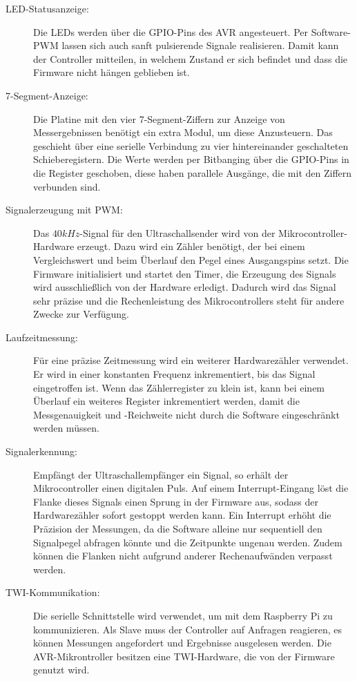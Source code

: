 \begin{description} %
	\item[LED-Statusanzeige:] Die LEDs werden über die \ac{GPIO}-Pins des AVR angesteuert. Per Software-\ac{PWM} lassen sich auch sanft pulsierende Signale realisieren. Damit kann der Controller mitteilen, in welchem Zustand er sich befindet und dass die Firmware nicht hängen geblieben ist.
	\item[7-Segment-Anzeige:] Die Platine mit den vier 7-Segment-Ziffern zur Anzeige von Messergebnissen benötigt ein extra Modul, um diese Anzusteuern. Das geschieht über eine serielle Verbindung zu vier hintereinander geschalteten Schieberegistern. Die Werte werden per \ac{Bitbanging} über die \ac{GPIO}-Pins in die Register geschoben, diese haben parallele Ausgänge, die mit den Ziffern verbunden sind.
	\item[Signalerzeugung mit \ac{PWM}:] Das $40kHz$-Signal für den Ultraschallsender wird von der Mikrocontroller-Hardware erzeugt. Dazu wird ein Zähler benötigt, der bei einem Vergleichswert und beim Überlauf den Pegel eines Ausgangspins setzt. Die Firmware initialisiert und startet den Timer, die Erzeugung des Signals wird ausschließlich von der Hardware erledigt. Dadurch wird das Signal sehr präzise und die Rechenleistung des Mikrocontrollers steht für andere Zwecke zur Verfügung.
	\item[Laufzeitmessung:] Für eine präzise Zeitmessung wird ein weiterer Hardwarezähler verwendet. Er wird in einer konstanten Frequenz inkrementiert, bis das Signal eingetroffen ist. Wenn das Zählerregister zu klein ist, kann bei einem Überlauf ein weiteres Register inkrementiert werden, damit die Messgenauigkeit und -Reichweite nicht durch die Software eingeschränkt werden müssen.
	\item[Signalerkennung:] Empfängt der Ultraschallempfänger ein Signal, so erhält der Mikrocontroller einen digitalen Puls. Auf einem Interrupt-Eingang löst die Flanke dieses Signals einen Sprung in der Firmware aus, sodass der Hardwarezähler sofort gestoppt werden kann. Ein Interrupt erhöht die Präzision der Messungen, da die Software alleine nur sequentiell den Signalpegel abfragen könnte und die Zeitpunkte ungenau werden. Zudem können die Flanken nicht aufgrund anderer Rechenaufwänden verpasst werden.
	\item[\ac{TWI}-Kommunikation:] Die serielle Schnittstelle wird verwendet, um mit dem Raspberry Pi zu kommunizieren. Als Slave muss der Controller auf Anfragen reagieren, es können Messungen angefordert und Ergebnisse ausgelesen werden. Die AVR-Mikrontroller besitzen eine \ac{TWI}-Hardware, die von der Firmware genutzt wird.
\end{description}


